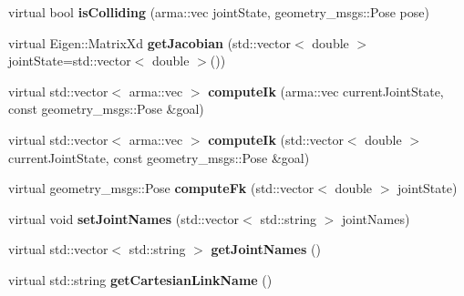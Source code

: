 \begin{DoxyCompactItemize}
\item 
virtual bool {\bfseries is\+Colliding} (arma\+::vec joint\+State, geometry\+\_\+msgs\+::\+Pose pose)\hypertarget{classkukadu_1_1CachedPlanner_af6ebcd64b0ff6f4d4f2221e857bf23b3}{}\label{classkukadu_1_1CachedPlanner_af6ebcd64b0ff6f4d4f2221e857bf23b3}

\item 
virtual Eigen\+::\+Matrix\+Xd {\bfseries get\+Jacobian} (std\+::vector$<$ double $>$ joint\+State=std\+::vector$<$ double $>$())\hypertarget{classkukadu_1_1CachedPlanner_a7aa487c1d8452abb5563584294f9c77c}{}\label{classkukadu_1_1CachedPlanner_a7aa487c1d8452abb5563584294f9c77c}

\item 
virtual std\+::vector$<$ arma\+::vec $>$ {\bfseries compute\+Ik} (arma\+::vec current\+Joint\+State, const geometry\+\_\+msgs\+::\+Pose \&goal)\hypertarget{classkukadu_1_1CachedPlanner_ac8ba6abe26d404f713affec8e8ebc9e9}{}\label{classkukadu_1_1CachedPlanner_ac8ba6abe26d404f713affec8e8ebc9e9}

\item 
virtual std\+::vector$<$ arma\+::vec $>$ {\bfseries compute\+Ik} (std\+::vector$<$ double $>$ current\+Joint\+State, const geometry\+\_\+msgs\+::\+Pose \&goal)\hypertarget{classkukadu_1_1CachedPlanner_ab5c0a4e18246ad13eb3ebf776224e65c}{}\label{classkukadu_1_1CachedPlanner_ab5c0a4e18246ad13eb3ebf776224e65c}

\item 
virtual geometry\+\_\+msgs\+::\+Pose {\bfseries compute\+Fk} (std\+::vector$<$ double $>$ joint\+State)\hypertarget{classkukadu_1_1CachedPlanner_a02e459ee30a7bf208892d330e4f7f09d}{}\label{classkukadu_1_1CachedPlanner_a02e459ee30a7bf208892d330e4f7f09d}

\item 
virtual void {\bfseries set\+Joint\+Names} (std\+::vector$<$ std\+::string $>$ joint\+Names)\hypertarget{classkukadu_1_1CachedPlanner_a21fb3c3bd2048b68cfc740e764141c62}{}\label{classkukadu_1_1CachedPlanner_a21fb3c3bd2048b68cfc740e764141c62}

\item 
virtual std\+::vector$<$ std\+::string $>$ {\bfseries get\+Joint\+Names} ()\hypertarget{classkukadu_1_1CachedPlanner_ae9aeaed93ce4de78da002ae9db531043}{}\label{classkukadu_1_1CachedPlanner_ae9aeaed93ce4de78da002ae9db531043}

\item 
virtual std\+::string {\bfseries get\+Cartesian\+Link\+Name} ()\hypertarget{classkukadu_1_1CachedPlanner_a0e29aaf0705d572a316ba74915f9a186}{}\label{classkukadu_1_1CachedPlanner_a0e29aaf0705d572a316ba74915f9a186}


\end{DoxyCompactItemize}
